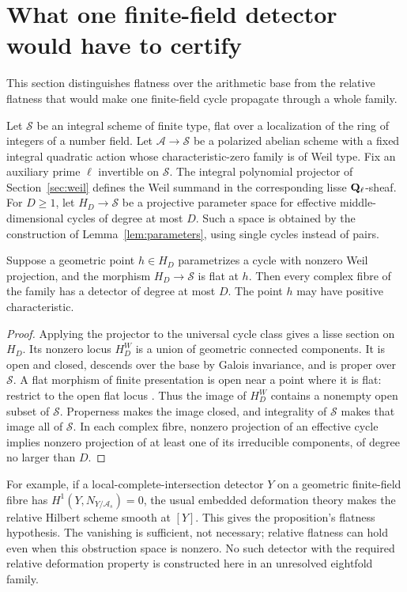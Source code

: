 \section{What one finite-field detector would have to certify}
\label{sec:one-prime}
This section distinguishes flatness over the arithmetic base from the relative flatness that would make one finite-field cycle propagate through a whole family.

Let $\mathcal S$ be an integral scheme of finite type, flat over a localization of the ring of integers of a number field. Let $\mathcal A\to\mathcal S$ be a polarized abelian scheme with a fixed integral quadratic action whose characteristic-zero family is of Weil type. Fix an auxiliary prime $\ell$ invertible on $\mathcal S$. The integral polynomial projector of Section~\ref{sec:weil} defines the Weil summand in the corresponding lisse $\mathbf Q_\ell$-sheaf. For $D\ge1$, let $H_D\to\mathcal S$ be a projective parameter space for effective middle-dimensional cycles of degree at most $D$. Such a space is obtained by the construction of Lemma~\ref{lem:parameters}, using single cycles instead of pairs.

\begin{proposition}\label{prop:flat-detector-witness}
Suppose a geometric point $h\in H_D$ parametrizes a cycle with nonzero Weil projection, and the morphism $H_D\to\mathcal S$ is flat at $h$. Then every complex fibre of the family has a detector of degree at most $D$. The point $h$ may have positive characteristic.
\end{proposition}

\begin{proof}
Applying the projector to the universal cycle class gives a lisse section on $H_D$. Its nonzero locus $H_D^{W}$ is a union of geometric connected components. It is open and closed, descends over the base by Galois invariance, and is proper over $\mathcal S$. A flat morphism of finite presentation is open near a point where it is flat: restrict to the open flat locus \cite[Theorems~2.4.6 and 11.1.1]{EGAIV}. Thus the image of $H_D^{W}$ contains a nonempty open subset of $\mathcal S$. Properness makes the image closed, and integrality of $\mathcal S$ makes that image all of $\mathcal S$. In each complex fibre, nonzero projection of an effective cycle implies nonzero projection of at least one of its irreducible components, of degree no larger than $D$.
\end{proof}

For example, if a local-complete-intersection detector $Y$ on a geometric finite-field fibre has $H^1(Y,N_{Y/\mathcal A_s})=0$, the usual embedded deformation theory makes the relative Hilbert scheme smooth at $[Y]$. This gives the proposition's flatness hypothesis. The vanishing is sufficient, not necessary; relative flatness can hold even when this obstruction space is nonzero. No such detector with the required relative deformation property is constructed here in an unresolved eightfold family.

